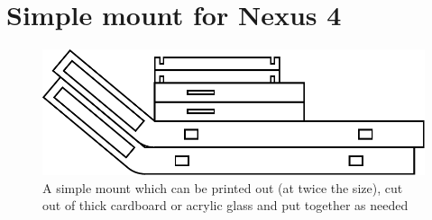 \documentclass[english,bt]{package/lmedoc}
\begin{document}
\appendix
\cleardoublepage
\chapter{Simple mount for Nexus 4}
\label{appendix-mount}
\begin{figure}
    \center
    \includegraphics{images/halter.pdf}
    \caption{A simple mount which can be printed out (at twice the size), cut out of thick cardboard or acrylic glass and put together as needed}
\end{figure}

\cleardoublepage
\cleardoublepage
\end{document}
